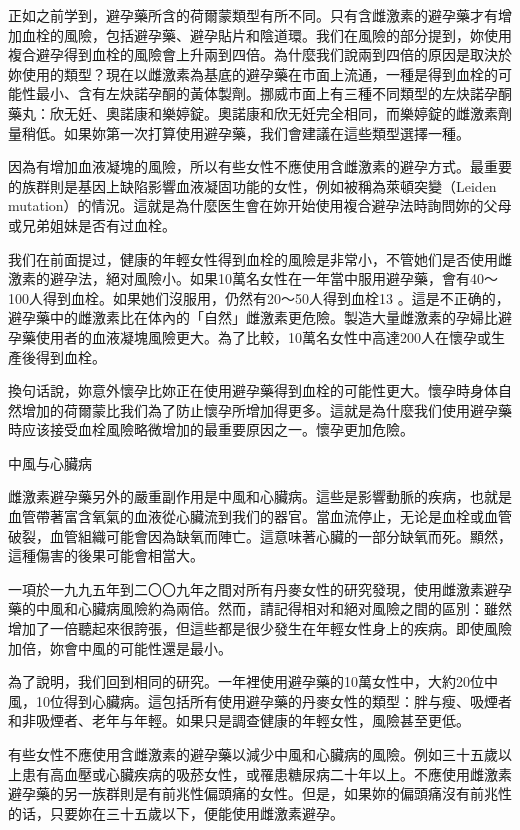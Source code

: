 \documentclass[12pt,UTF8]{ctexbook}
\begin{document}
正如之前学到，避孕藥所含的荷爾蒙類型有所不同。只有含雌激素的避孕藥才有增加血栓的風險，包括避孕藥、避孕貼片和陰道環。我们在風險的部分提到，妳使用複合避孕得到血栓的風險會上升兩到四倍。為什麼我们說兩到四倍的原因是取決於妳使用的類型？現在以雌激素為基底的避孕藥在市面上流通，一種是得到血栓的可能性最小、含有左炔諾孕酮的黃体製劑。挪威市面上有三種不同類型的左炔諾孕酮藥丸：欣无妊、奧諾康和樂婷錠。奧諾康和欣无妊完全相同，而樂婷錠的雌激素劑量稍低。如果妳第一次打算使用避孕藥，我们會建議在這些類型選擇一種。

因為有增加血液凝塊的風險，所以有些女性不應使用含雌激素的避孕方式。最重要的族群則是基因上缺陷影響血液凝固功能的女性，例如被稱為萊頓突變（Leiden mutation）的情況。這就是為什麼医生會在妳开始使用複合避孕法時詢問妳的父母或兄弟姐妹是否有过血栓。

我们在前面提过，健康的年輕女性得到血栓的風險是非常小，不管她们是否使用雌激素的避孕法，絕对風險小。如果10萬名女性在一年當中服用避孕藥，會有40〜100人得到血栓。如果她们沒服用，仍然有20〜50人得到血栓13 。這是不正确的，避孕藥中的雌激素比在体內的「自然」雌激素更危險。製造大量雌激素的孕婦比避孕藥使用者的血液凝塊風險更大。為了比較，10萬名女性中高達200人在懷孕或生產後得到血栓。

換句话說，妳意外懷孕比妳正在使用避孕藥得到血栓的可能性更大。懷孕時身体自然增加的荷爾蒙比我们為了防止懷孕所增加得更多。這就是為什麼我们使用避孕藥時应该接受血栓風險略微增加的最重要原因之一。懷孕更加危險。





中風与心臟病




雌激素避孕藥另外的嚴重副作用是中風和心臟病。這些是影響動脈的疾病，也就是血管帶著富含氧氣的血液從心臟流到我们的器官。當血流停止，无论是血栓或血管破裂，血管組織可能會因為缺氧而陣亡。這意味著心臟的一部分缺氧而死。顯然，這種傷害的後果可能會相當大。

一項於一九九五年到二〇〇九年之間对所有丹麥女性的研究發現，使用雌激素避孕藥的中風和心臟病風險約為兩倍。然而，請記得相对和絕对風險之間的區別：雖然增加了一倍聽起來很誇張，但這些都是很少發生在年輕女性身上的疾病。即使風險加倍，妳會中風的可能性還是最小。

為了說明，我们回到相同的研究。一年裡使用避孕藥的10萬女性中，大約20位中風，10位得到心臟病。這包括所有使用避孕藥的丹麥女性的類型：胖与瘦、吸煙者和非吸煙者、老年与年輕。如果只是調查健康的年輕女性，風險甚至更低。

有些女性不應使用含雌激素的避孕藥以減少中風和心臟病的風險。例如三十五歲以上患有高血壓或心臟疾病的吸菸女性，或罹患糖尿病二十年以上。不應使用雌激素避孕藥的另一族群則是有前兆性偏頭痛的女性。但是，如果妳的偏頭痛沒有前兆性的话，只要妳在三十五歲以下，便能使用雌激素避孕。
\end{document}

